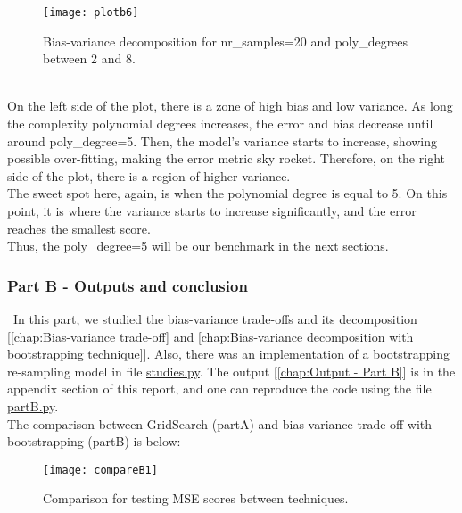 \begin{figure}[H]
\label{fig:plotB6}
\centering
\texttt{[image: plotb6]}
\caption{Bias-variance decomposition for nr\_samples=20 and poly\_degrees between 2 and 8.}
\end{figure}\\

On the left side of the plot, there is a zone of high bias and low variance. As long the complexity polynomial degrees increases, the error and bias decrease until around poly\_degree=5. Then, the model's variance starts to increase, showing possible over-fitting, making the error metric sky rocket. Therefore, on the right side of the plot, there is a region of higher variance. \\

The sweet spot here, again, is when the polynomial degree is equal to 5. On this point, it is where the variance starts to increase significantly, and the error reaches the smallest score. \\

Thus, the poly\_degree=5 will be our benchmark in the next sections. \\

\subsubsection{Part B - Outputs and conclusion}
\label{chap:Part B - Outputs and conclusion}

\quad \, In this part, we studied the bias-variance trade-offs and its decomposition [\ref{chap:Bias-variance trade-off} and \ref{chap:Bias-variance decomposition with bootstrapping technique}]. Also, there was an implementation of a bootstrapping re-sampling model in file \href{https://github.com/fabiorodp/UiO-FYS-STK4155/blob/master/Project1/package/studies.py}{studies.py}. The output [\ref{chap:Output - Part B}] is in the appendix section of this report, and one can reproduce the code using the file \href{https://github.com/fabiorodp/UiO-FYS-STK4155/blob/master/Project1/partB.py}{partB.py}.\\

The  comparison  between  GridSearch  (partA)  and  bias-variance  trade-off with bootstrapping (partB) is below: \\

\begin{figure}[H]
\label{fig:compareB1}
\centering
\texttt{[image: compareB1]}
\caption{Comparison for testing MSE scores between techniques.}
\end{figure}\\

